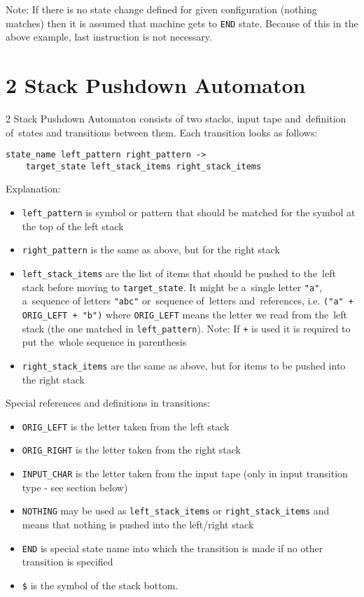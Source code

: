 \documentclass[english,shortabstract,mgr]{iithesis}
\begin{document}
Note: If there is no state change defined for given configuration
(nothing matches) then it is assumed that machine gets to \texttt{END} state.
Because of this in the above example, last instruction is not necessary.

\section {2 Stack Pushdown Automaton}

2 Stack Pushdown Automaton consists of two stacks, input tape and~definition
of~states and transitions between them. Each transition looks as follows:
\begin{verbatim}
state_name left_pattern right_pattern ->
    target_state left_stack_items right_stack_items
\end{verbatim}

Explanation:
\begin{itemize}
  \item \texttt{left\_pattern} is symbol or pattern that should be matched
      for the symbol at the top of the left stack
  \item \texttt{right\_pattern} is the same as above, but for the right stack
  \item \texttt{left\_stack\_items} are the list of items that should be pushed
      to the~left stack before moving to \texttt{target\_state}. It might be
      a~single letter \texttt{"a"}, a~sequence of letters \texttt{"abc"}
      or~sequence of~letters and~references, i.e. \texttt{("a" + ORIG\_LEFT + "b")}
      where \texttt{ORIG\_LEFT} means the letter we read from the~left stack (the one matched
      in \texttt{left\_pattern}). Note: If \texttt{+} is used it is required to put
      the~whole sequence in parenthesis
  \item \texttt{right\_stack\_items} are the same as above, but for items to be pushed into
      the right stack
\end{itemize}

Special references and definitions in transitions:
\begin{itemize}
  \item \texttt{ORIG\_LEFT} is the letter taken from the left stack
  \item \texttt{ORIG\_RIGHT} is the letter taken from the right stack
  \item \texttt{INPUT\_CHAR} is the letter taken from the input tape
      (only in input transition type - see section below)
  \item \texttt{NOTHING} may be used as \texttt{left\_stack\_items} or \texttt{right\_stack\_items}
      and means that nothing is pushed into the left/right stack
  \item \texttt{END} is special state name into which the transition is made if no other transition is specified
  \item \texttt{\$} is the symbol of the stack bottom.
\end{itemize}
\end{document}
